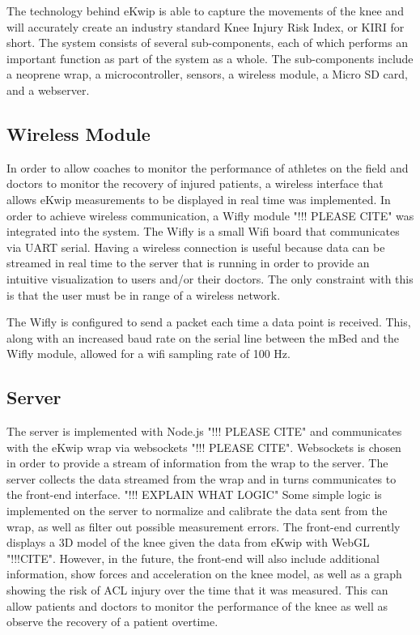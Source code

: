 The technology behind eKwip is able to capture the movements of the knee and will accurately create an industry standard Knee Injury Risk Index, or KIRI for short. The system consists of several sub-components, each of which performs an important function as part of the system as a whole. The sub-components include a neoprene wrap, a microcontroller, sensors, a wireless module, a Micro SD card, and a webserver.

\subsection {Wireless Module}
In order to allow coaches to monitor the performance of athletes on the field and doctors to monitor the recovery of injured patients, a wireless interface that allows eKwip measurements to be displayed in real time was implemented. In order to achieve wireless communication, a Wifly module "!!! PLEASE CITE" was integrated into the system. The Wifly is a small Wifi board that communicates via UART serial. Having a wireless connection is useful because data can be streamed in real time to the server that is running in order to provide an intuitive visualization to users and/or their doctors. The only constraint with this is that the user must be in range of a wireless network.

The Wifly is configured to send a packet each time a data point is received. This, along with an increased baud rate on the serial line between the mBed and the Wifly module, allowed for a wifi sampling rate of 100 Hz.

\subsection {Server}
The server is implemented with Node.js "!!! PLEASE CITE" and communicates with the eKwip wrap via websockets "!!! PLEASE CITE". Websockets is chosen in order to provide a stream of information from the wrap to the server. The server collects the data streamed from the wrap and in turns communicates to the front-end interface. "!!! EXPLAIN WHAT LOGIC" Some simple logic is implemented on the server to normalize and calibrate the data sent from the wrap, as well as filter out possible measurement errors. The front-end currently displays a 3D model of the knee given the data from eKwip with WebGL "!!!CITE". However, in the future, the front-end will also include additional information, show forces and acceleration on the knee model, as well as a graph showing the risk of ACL injury over the time that it was measured. This can allow patients and doctors to monitor the performance of the knee as well as observe the recovery of a patient overtime.
